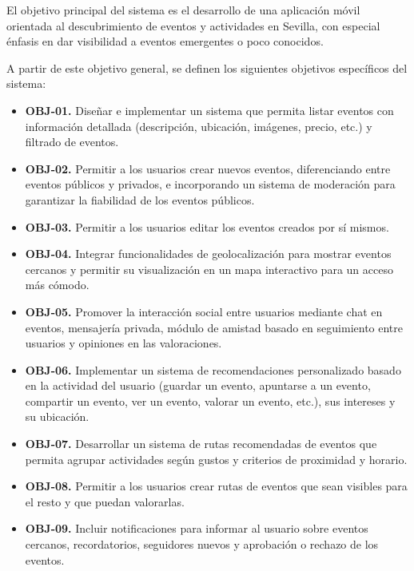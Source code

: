 El objetivo principal del sistema es el desarrollo de una aplicación móvil orientada al descubrimiento de eventos y actividades en Sevilla, con especial énfasis en dar visibilidad a eventos emergentes o poco conocidos.

A partir de este objetivo general, se definen los siguientes objetivos específicos del sistema:

\begin{itemize}
    \item {}\label{obj:01}\textbf{OBJ-01.} Diseñar e implementar un sistema que permita listar eventos con información detallada (descripción, ubicación, imágenes, precio, etc.) y filtrado de eventos.

    \item {}\label{obj:02}\textbf{OBJ-02.} Permitir a los usuarios crear nuevos eventos, diferenciando entre eventos públicos y privados, e incorporando un sistema de moderación para garantizar la fiabilidad de los eventos públicos.

    \item {}\label{obj:03}\textbf{OBJ-03.} Permitir a los usuarios editar los eventos creados por sí mismos.

    \item {}\label{obj:04}\textbf{OBJ-04.} Integrar funcionalidades de geolocalización para mostrar eventos cercanos y permitir su visualización en un mapa interactivo para un acceso más cómodo.

    \item {}\label{obj:05}\textbf{OBJ-05.} Promover la interacción social entre usuarios mediante chat en eventos, mensajería privada, módulo de amistad basado en seguimiento entre usuarios y opiniones en las valoraciones.

    \item {}\label{obj:06}\textbf{OBJ-06.} Implementar un sistema de recomendaciones personalizado basado en la actividad del usuario (guardar un evento, apuntarse a un evento, compartir un evento, ver un evento, valorar un evento, etc.), sus intereses y su ubicación.

    \item {}\label{obj:07}\textbf{OBJ-07.} Desarrollar un sistema de rutas recomendadas de eventos que permita agrupar actividades según gustos y criterios de proximidad y horario.

    \item {}\label{obj:08}\textbf{OBJ-08.} Permitir a los usuarios crear rutas de eventos que sean visibles para el resto y que puedan valorarlas.

    \item {}\label{obj:09}\textbf{OBJ-09.} Incluir notificaciones para informar al usuario sobre eventos cercanos, recordatorios, seguidores nuevos y aprobación o rechazo de los eventos.
\end{itemize}

